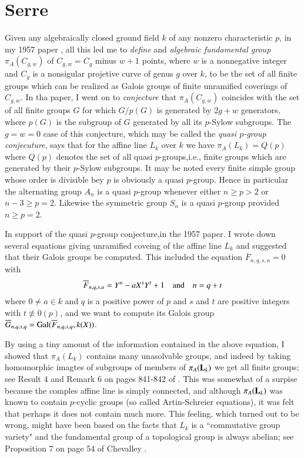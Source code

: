 \section{Serre}\label{chap1-sec6}

Given any algebraically closed ground field $k$ of any nonzero characteristic $p$, in my 1957 paper \cite{chap1-key3}, all this led me to \textit{define} and \textit{algebraic fundamental group} $\pi_{A}(C_{g,w})$ of $C_{g,w} = C_{g}$ minus $w+1$ points, where $w$ is a nonnegative integer and $C_{g}$ is a nonsigular projetive curve of genus $g$ over $k$, to be the set of all finite groups which can be realized as Galois groups of finite unramified coverings of $C_{g,w}$. In tha paper, I went on to \textit{conjecture} that $\pi_{A}(C_{g,w})$ coincides with the set of all finite groups $G$ for which $G/p(G)$ is generated by $2g+w$ generators, where $p(G)$ is the subgroup of $G$ generated by all its $p$-Sylow subgroups. The $g=w=0$ case of this conjecture, which may be called the \textit{quasi $p$-group conjecuture}, says that for the affine line $L_{k}$ over $k$ we have $\pi_{A}(L_{k})=Q(p)$ where $Q(p)$ denotes the set of all quasi $p$-groups,\pageoriginale i.e., finite groups which are generated by their $p$-Sylow subgroups. It may be noted every finite simple group whose order is divisible bey $p$ is obviously a quasi $p$-group. Hence in particular the alternating group $A_{n}$ is a quasi $p$-group whenever either $n\geq p > 2$ or $n-3\geq p=2$. Likewise the symmetric group $S_{n}$ is a quasi $p$-group provided $n\geq p=2$.   

In support of the quasi $p$-group conjecture,in the 1957 paper. I wrote down several equations giving unramified coveing of the affine line $L_{k}$ and suggested that their Galois groups be computed. This included the equation $\overline{F}_{n,q,s,a}=0$ with
$$
\overline{F}_{n,q,s,a}=Y^{n}-aX^{s}Y^{t} + 1 \quad {\rm and} \quad n=q+t
$$
where $0\neq a \in k$ and $q$ is a positive power of $p$ and $s$ and $t$ are positive integers with $t \nequiv 0(p)$, and we want to compute its Galois group $\overline{G}_{n,q,s,q} = {\rm Gal}(\overline{F}_{n,q,s,q}, k(X))$.

By using a tiny amount of the information contained in the above equation, I showed that $\pi_{A}(L_{k})$ contains many unasolvable groups, and indeed by taking homomorphic imagtes of subgroups of members of $\pi_{A}(\mathbf{L}_{k})$ we get all finite groups; see Result 4 and Remark 6 on pages 841-842 of \cite{chap1-key3}. This was somewhat of a surpise because the comples affine line is simply connected, and although $\pi_{A}(\mathbf{L}_{k})$ was known to contain $p$-cyclic groups (so called Artin-Schreier equations), it was felt that perhaps it does not contain much more. This feeling, which turned out to be wrong, might have been based on the facts that $L_{k}$ is a ``commutative group variety" and the fundamental group of a topological group is always abelian; see Proposition 7 on page 54 of Chevalley \cite{chap1-key26}.

